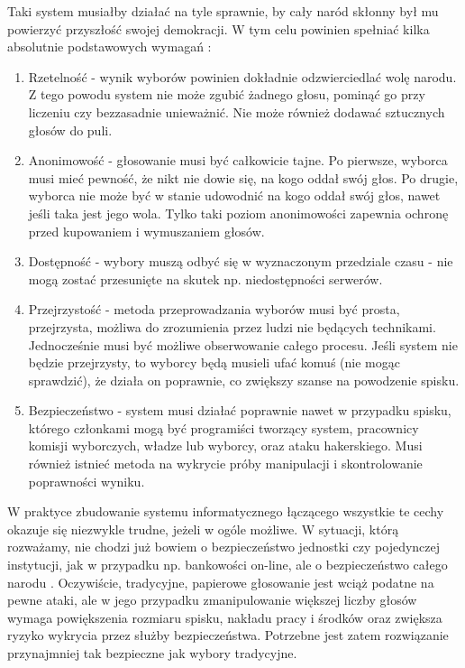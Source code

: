 \documentclass[polish]{kbk}
\begin{document}
Taki system musiałby działać na tyle sprawnie, by cały naród skłonny był mu powierzyć przyszłość swojej demokracji. W tym celu powinien spełniać kilka absolutnie podstawowych wymagań \cite{google}:
\begin{enumerate}
\item Rzetelność - wynik wyborów powinien dokładnie odzwierciedlać wolę narodu. Z tego powodu system nie może zgubić żadnego głosu, pominąć go przy liczeniu czy bezzasadnie unieważnić. Nie może również dodawać sztucznych głosów do puli.
\item Anonimowość - głosowanie musi być całkowicie tajne. Po pierwsze, wyborca musi mieć pewność, że nikt nie dowie się, na kogo oddał swój głos. Po drugie, wyborca nie może być w stanie udowodnić na kogo oddał swój głos, nawet jeśli taka jest jego wola. Tylko taki poziom anonimowości zapewnia ochronę przed kupowaniem i wymuszaniem głosów.
\item Dostępność - wybory muszą odbyć się w wyznaczonym przedziale czasu - nie mogą zostać przesunięte na skutek np. niedostępności serwerów.
\item Przejrzystość - metoda przeprowadzania wyborów musi być prosta, przejrzysta, możliwa do zrozumienia przez ludzi nie będących technikami. Jednocześnie musi być możliwe obserwowanie całego procesu. Jeśli system nie będzie przejrzysty, to wyborcy będą musieli ufać komuś (nie mogąc sprawdzić), że działa on poprawnie, co zwiększy szanse na powodzenie spisku.
\item Bezpieczeństwo - system musi działać poprawnie nawet w przypadku spisku, którego członkami mogą być programiści tworzący system, pracownicy komisji wyborczych, władze lub wyborcy, oraz ataku hakerskiego. Musi również istnieć metoda na wykrycie próby manipulacji i skontrolowanie poprawności wyniku.
\end{enumerate}

W praktyce zbudowanie systemu informatycznego łączącego wszystkie te cechy okazuje się niezwykle trudne, jeżeli w ogóle możliwe. W sytuacji, którą rozważamy, nie chodzi już bowiem o bezpieczeństwo jednostki czy pojedynczej instytucji, jak w przypadku np. bankowości on-line, ale o bezpieczeństwo całego narodu \cite{google}. Oczywiście, tradycyjne, papierowe głosowanie jest wciąż podatne na pewne ataki, ale w jego przypadku zmanipulowanie większej liczby głosów wymaga powiększenia rozmiaru spisku, nakładu pracy i środków oraz zwiększa ryzyko wykrycia przez służby bezpieczeństwa. Potrzebne jest zatem rozwiązanie przynajmniej tak bezpieczne jak wybory tradycyjne.
\end{document}

